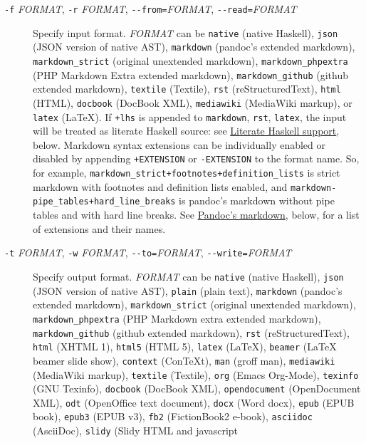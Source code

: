 \documentclass[]{article}
\begin{document}
\begin{description}
\item[\texttt{-f} \emph{FORMAT}, \texttt{-r} \emph{FORMAT},
\texttt{-{}-from=}\emph{FORMAT}, \texttt{-{}-read=}\emph{FORMAT}]
Specify input format. \emph{FORMAT} can be \texttt{native} (native
Haskell), \texttt{json} (JSON version of native AST), \texttt{markdown}
(pandoc's extended markdown), \texttt{markdown\_strict} (original
unextended markdown), \texttt{markdown\_phpextra} (PHP Markdown Extra
extended markdown), \texttt{markdown\_github} (github extended
markdown), \texttt{textile} (Textile), \texttt{rst} (reStructuredText),
\texttt{html} (HTML), \texttt{docbook} (DocBook XML), \texttt{mediawiki}
(MediaWiki markup), or \texttt{latex} (LaTeX). If \texttt{+lhs} is
appended to \texttt{markdown}, \texttt{rst}, \texttt{latex}, the input
will be treated as literate Haskell source: see
\hyperref[literate-haskell-support]{Literate Haskell support}, below.
Markdown syntax extensions can be individually enabled or disabled by
appending \texttt{+EXTENSION} or \texttt{-EXTENSION} to the format name.
So, for example, \texttt{markdown\_strict+footnotes+definition\_lists}
is strict markdown with footnotes and definition lists enabled, and
\texttt{markdown-pipe\_tables+hard\_line\_breaks} is pandoc's markdown
without pipe tables and with hard line breaks. See
\hyperref[pandocs-markdown]{Pandoc's markdown}, below, for a list of
extensions and their names.
\item[\texttt{-t} \emph{FORMAT}, \texttt{-w} \emph{FORMAT},
\texttt{-{}-to=}\emph{FORMAT}, \texttt{-{}-write=}\emph{FORMAT}]
Specify output format. \emph{FORMAT} can be \texttt{native} (native
Haskell), \texttt{json} (JSON version of native AST), \texttt{plain}
(plain text), \texttt{markdown} (pandoc's extended markdown),
\texttt{markdown\_strict} (original unextended markdown),
\texttt{markdown\_phpextra} (PHP Markdown extra extended markdown),
\texttt{markdown\_github} (github extended markdown), \texttt{rst}
(reStructuredText), \texttt{html} (XHTML 1), \texttt{html5} (HTML 5),
\texttt{latex} (LaTeX), \texttt{beamer} (LaTeX beamer slide show),
\texttt{context} (ConTeXt), \texttt{man} (groff man), \texttt{mediawiki}
(MediaWiki markup), \texttt{textile} (Textile), \texttt{org} (Emacs
Org-Mode), \texttt{texinfo} (GNU Texinfo), \texttt{docbook} (DocBook
XML), \texttt{opendocument} (OpenDocument XML), \texttt{odt} (OpenOffice
text document), \texttt{docx} (Word docx), \texttt{epub} (EPUB book),
\texttt{epub3} (EPUB v3), \texttt{fb2} (FictionBook2 e-book),
\texttt{asciidoc} (AsciiDoc), \texttt{slidy} (Slidy HTML and javascript

\end{description}
\end{document}
